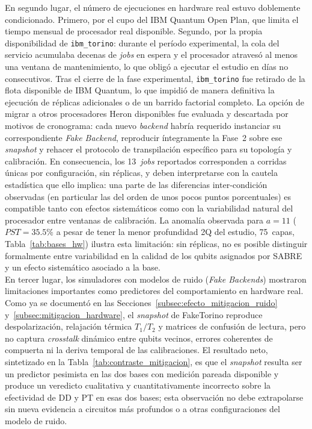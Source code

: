 \documentclass[12pt, spanish]{book}
\begin{document}
En segundo lugar, el número de ejecuciones en hardware real estuvo doblemente condicionado. Primero, por el cupo del IBM Quantum Open Plan, que limita el tiempo mensual de procesador real disponible. Segundo, por la propia disponibilidad de \texttt{ibm\_torino}: durante el período experimental, la cola del servicio acumulaba decenas de \textit{jobs} en espera y el procesador atravesó al menos una ventana de mantenimiento, lo que obligó a ejecutar el estudio en días no consecutivos. Tras el cierre de la fase experimental, \texttt{ibm\_torino} fue retirado de la flota disponible de IBM Quantum, lo que impidió de manera definitiva la ejecución de réplicas adicionales o de un barrido factorial completo. La opción de migrar a otros procesadores Heron disponibles fue evaluada y descartada por motivos de cronograma: cada nuevo \textit{backend} habría requerido instanciar su correspondiente \textit{Fake Backend}, reproducir íntegramente la Fase~2 sobre ese \textit{snapshot} y rehacer el protocolo de transpilación específico para su topología y calibración. En consecuencia, los 13~\textit{jobs} reportados corresponden a corridas únicas por configuración, sin réplicas, y deben interpretarse con la cautela estadística que ello implica: una parte de las diferencias inter-condición observadas (en particular las del orden de unos pocos puntos porcentuales) es compatible tanto con efectos sistemáticos como con la variabilidad natural del procesador entre ventanas de calibración. La anomalía observada para $a = 11$ ($PST = 35.5\%$ a pesar de tener la menor profundidad 2Q del estudio, 75~capas, Tabla~\ref{tab:bases_hw}) ilustra esta limitación: sin réplicas, no es posible distinguir formalmente entre variabilidad en la calidad de los qubits asignados por SABRE y un efecto sistemático asociado a la base.\\

En tercer lugar, los simuladores con modelos de ruido (\textit{Fake Backends}) mostraron limitaciones importantes como predictores del comportamiento en hardware real. Como ya se documentó en las Secciones~\ref{subsec:efecto_mitigacion_ruido} y~\ref{subsec:mitigacion_hardware}, el \textit{snapshot} de FakeTorino reproduce despolarización, relajación térmica $T_1/T_2$ y matrices de confusión de lectura, pero no captura \textit{crosstalk} dinámico entre qubits vecinos, errores coherentes de compuerta ni la deriva temporal de las calibraciones. El resultado neto, sintetizado en la Tabla~\ref{tab:contraste_mitigacion}, es que el \textit{snapshot} resulta ser un predictor pesimista en las dos bases con medición pareada disponible y produce un veredicto cualitativa y cuantitativamente incorrecto sobre la efectividad de DD y PT en esas dos bases; esta observación no debe extrapolarse sin nueva evidencia a circuitos más profundos o a otras configuraciones del modelo de ruido.\\
\end{document}
